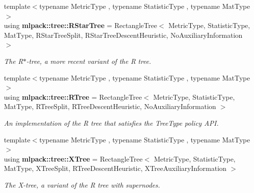 \begin{DoxyCompactItemize}
{\footnotesize template$<$typename Metric\+Type , typename Statistic\+Type , typename Mat\+Type $>$ }\\using {\bf mlpack\+::tree\+::\+R\+Star\+Tree} = Rectangle\+Tree$<$ Metric\+Type, Statistic\+Type, Mat\+Type, R\+Star\+Tree\+Split, R\+Star\+Tree\+Descent\+Heuristic, No\+Auxiliary\+Information $>$
\begin{DoxyCompactList}\small\item\em The R$\ast$-\/tree, a more recent variant of the R tree. \end{DoxyCompactList}\item 
{\footnotesize template$<$typename Metric\+Type , typename Statistic\+Type , typename Mat\+Type $>$ }\\using {\bf mlpack\+::tree\+::\+R\+Tree} = Rectangle\+Tree$<$ Metric\+Type, Statistic\+Type, Mat\+Type, R\+Tree\+Split, R\+Tree\+Descent\+Heuristic, No\+Auxiliary\+Information $>$
\begin{DoxyCompactList}\small\item\em An implementation of the R tree that satisfies the Tree\+Type policy A\+PI. \end{DoxyCompactList}\item 
{\footnotesize template$<$typename Metric\+Type , typename Statistic\+Type , typename Mat\+Type $>$ }\\using {\bf mlpack\+::tree\+::\+X\+Tree} = Rectangle\+Tree$<$ Metric\+Type, Statistic\+Type, Mat\+Type, X\+Tree\+Split, R\+Tree\+Descent\+Heuristic, X\+Tree\+Auxiliary\+Information $>$
\begin{DoxyCompactList}\small\item\em The X-\/tree, a variant of the R tree with supernodes. \end{DoxyCompactList}\end{DoxyCompactItemize}
